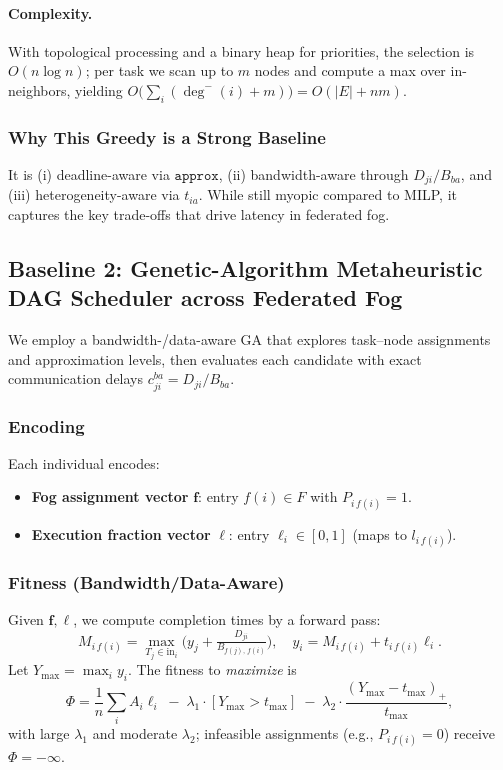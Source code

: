 \paragraph{Complexity.} With topological processing and a binary heap for priorities, the selection is \(O(n\log n)\); per task we scan up to \(m\) nodes and compute a max over in-neighbors, yielding \(O\!\big(\sum_i (\deg^-(i)+m)\big)=O(|E|+nm)\).

\subsubsection{Why This Greedy is a Strong Baseline}
It is (i) deadline-aware via \(\texttt{approx}\), (ii) bandwidth-aware through \(D_{ji}/B_{ba}\), and (iii) heterogeneity-aware via \(t_{ia}\). While still myopic compared to MILP, it captures the key trade-offs that drive latency in federated fog.

\subsection{Baseline 2: Genetic-Algorithm Metaheuristic DAG Scheduler across Federated Fog}
\label{sec:baseline-ga}

We employ a bandwidth-/data-aware GA that explores task--node assignments and approximation levels, then evaluates each candidate with exact communication delays \(c_{ji}^{ba}=D_{ji}/B_{ba}\).

\subsubsection{Encoding}
Each individual encodes:
\begin{itemize}
    \item \textbf{Fog assignment vector} \(\mathbf{f}\): entry \(f(i)\in F\) with \(P_{i\,f(i)}=1\).
    \item \textbf{Execution fraction vector} \(\boldsymbol{\ell}\): entry \(\ell_i\in[0,1]\) (maps to \(l_{i\,f(i)}\)).
\end{itemize}

\subsubsection{Fitness (Bandwidth/Data-Aware)}
Given \(\mathbf{f},\boldsymbol{\ell}\), we compute completion times by a forward pass:
\[
M_{i\,f(i)}=\max_{T_j\in \text{in}_i}\!\Big(y_j+\tfrac{D_{ji}}{B_{f(j),\,f(i)}}\Big),\quad
y_i=M_{i\,f(i)}+t_{i\,f(i)}\ell_i.
\]
Let \(Y_{\max}=\max_i y_i\). The fitness to \emph{maximize} is
\[
\Phi=\frac{1}{n}\sum_i A_i \ell_i\;-\;\lambda_1\!\cdot\![Y_{\max}>t_{\max}]\;-\;\lambda_2\!\cdot\!\frac{(Y_{\max}-t_{\max})_+}{t_{\max}},
\]
with large \(\lambda_1\) and moderate \(\lambda_2\); infeasible assignments (e.g., \(P_{i\,f(i)}=0\)) receive \(\Phi=-\infty\).

